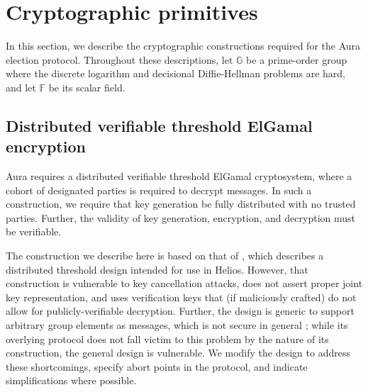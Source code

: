 \documentclass{llncs}
\newcommand{\G}{\mathbb{G}}
\newcommand{\F}{\mathbb{F}}
\begin{document}
\section{Cryptographic primitives}

In this section, we describe the cryptographic constructions required for the Aura election protocol.
Throughout these descriptions, let $\G$ be a prime-order group where the discrete logarithm and decisional Diffie-Hellman problems are hard, and let $\F$ be its scalar field.


\subsection{Distributed verifiable threshold ElGamal encryption}

Aura requires a distributed verifiable threshold ElGamal cryptosystem, where a cohort of designated parties is required to decrypt messages.
In such a construction, we require that key generation be fully distributed with no trusted parties.
Further, the validity of key generation, encryption, and decryption must be verifiable.

The construction we describe here is based on that of \cite{cortier}, which describes a distributed threshold design intended for use in Helios.
However, that construction is vulnerable to key cancellation attacks, does not assert proper joint key representation, and uses verification keys that (if maliciously crafted) do not allow for publicly-verifiable decryption.
Further, the design is generic to support arbitrary group elements as messages, which is not secure in general \cite{boneh}; while its overlying protocol does not fall victim to this problem by the nature of its construction, the general design is vulnerable.
We modify the design to address these shortcomings, specify abort points in the protocol, and indicate simplifications where possible.
\end{document}
